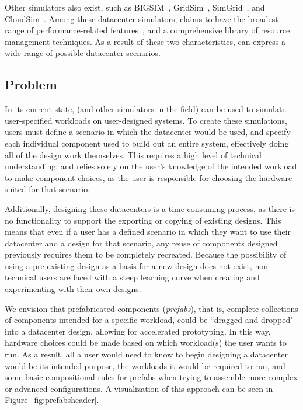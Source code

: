 \documentclass[11pt]{article}
\begin{document}
		Other simulators also exist, such as BIGSIM~\cite{Zheng2004}, GridSim~\cite{Buyya2002}, SimGrid~\cite{Casanova2008}, and CloudSim~\cite{Calheiros2011}.
		Among these datacenter simulators, \opendc{} claims to have the broadest range of performance-related features~\cite{Andreadis2018}, and a comprehensive library of resource management techniques.
		As a result of these two characteristics, \opendc{} can express a wide range of possible datacenter scenarios.
	
	\subsection{Problem}
		In its current state, \opendc{} (and other simulators in the field) can be used to simulate user-specified workloads on user-designed systems. 
		To create these simulations, users must define a scenario in which the datacenter would be used, and specify each individual component used to build out an entire system, effectively doing all of the design work themselves. 
		This requires a high level of technical understanding, and relies solely on the user's knowledge of the intended workload to make component choices, as the user is responsible for choosing the hardware suited for that scenario. 
		
		Additionally, designing these datacenters is a time-consuming process, as there is no functionality to support the exporting or copying of existing designs.
		This means that even if a user has a defined scenario in which they want to use their datacenter and a design for that scenario, any reuse of components designed previously requires them to be completely recreated.
		Because the possibility of using a pre-existing design as a basis for a new design does not exist, non-technical users are faced with a steep learning curve when creating and experimenting with their own designs. 
		
		We envision that prefabricated components (\textit{prefabs}), that is, complete collections of components intended for a specific workload, could be ``dragged and dropped" into a datacenter design, allowing for accelerated prototyping.
		In this way, hardware choices could be made based on which workload(s) the user wants to run.
		As a result, all a user would need to know to begin designing a datacenter would be its intended purpose, the workloads it would be required to run, and some basic compositional rules for prefabs when trying to assemble more complex or advanced configurations.
		A visualization of this approach can be seen in Figure~\ref{fig:prefabsheader}.
\end{document}

